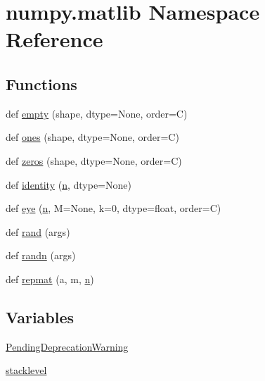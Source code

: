 \hypertarget{namespacenumpy_1_1matlib}{}\section{numpy.\+matlib Namespace Reference}
\label{namespacenumpy_1_1matlib}
\subsection*{Functions}
\begin{DoxyCompactItemize}
\item 
def \hyperlink{namespacenumpy_1_1matlib_ae6880bc0a71e56b1bcf254f3fb0a9618}{empty} (shape, dtype=None, order=\textquotesingle{}C\textquotesingle{})
\item 
def \hyperlink{namespacenumpy_1_1matlib_add2246c8e4ba0232b5df64e88a59599b}{ones} (shape, dtype=None, order=\textquotesingle{}C\textquotesingle{})
\item 
def \hyperlink{namespacenumpy_1_1matlib_a60e275620ed434de08d9b32661bf72a4}{zeros} (shape, dtype=None, order=\textquotesingle{}C\textquotesingle{})
\item 
def \hyperlink{namespacenumpy_1_1matlib_af468e4fd99f7c0245747fb01e067c4cb}{identity} (\hyperlink{namespacenumpy_a352663c52853d2754274407d5cae2832}{n}, dtype=None)
\item 
def \hyperlink{namespacenumpy_1_1matlib_ae948d4d47944f7c37fffdde431667728}{eye} (\hyperlink{namespacenumpy_a352663c52853d2754274407d5cae2832}{n}, M=None, k=0, dtype=float, order=\textquotesingle{}C\textquotesingle{})
\item 
def \hyperlink{namespacenumpy_1_1matlib_a4509084367045a8510ead57c99cafc44}{rand} (args)
\item 
def \hyperlink{namespacenumpy_1_1matlib_afa4283aad15eb2e9fc3fdad49dc6d754}{randn} (args)
\item 
def \hyperlink{namespacenumpy_1_1matlib_af5303554e156055733afe9e3cd7535ae}{repmat} (a, m, \hyperlink{namespacenumpy_a352663c52853d2754274407d5cae2832}{n})
\end{DoxyCompactItemize}
\subsection*{Variables}
\begin{DoxyCompactItemize}
\item 
\hyperlink{namespacenumpy_1_1matlib_a948bcd593cf9e1f05bf3ee54f059adee}{Pending\+Deprecation\+Warning}
\item 
\hyperlink{namespacenumpy_1_1matlib_ac8d159307210967afcc8a6c46ace29c2}{stacklevel}
\end{DoxyCompactItemize}


